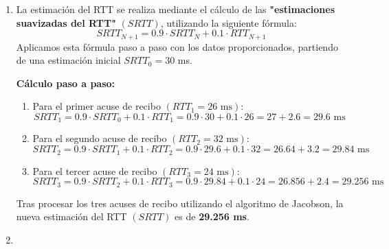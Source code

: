 \begin{enumerate}[label=\color{red}\textbf{\arabic*)}]
	      La fase de comienzo lento se caracteriza porque \textbf{"se comienza por doblar el valor de cwnd cada RTT unidades de tiempo"}. Aplicando esta secuencia temporalmente con nuestro RTT de 10 ms:
	      \begin{itemize}[label=\textbullet]
		      \item $t=0$ ms: El valor inicial es de \textbf{1 segmento} (2 KB)
		      \item $t=10$ ms: Se dobla el valor a \textbf{2 segmentos} (4 KB)
		      \item $t=20$ ms: Se dobla el valor a \textbf{4 segmentos} (8 KB)
		      \item $t=30$ ms: Se dobla el valor a \textbf{8 segmentos} (16 KB)
		      \item $t=40$ ms: Se dobla el valor a \textbf{16 segmentos} (32 KB)
	      \end{itemize}
	      A los \textbf{40 ms (4 RTTs)}, el valor de la ventana de congestión alcanza los 16 segmentos, superando por primera vez la capacidad total de la ventana de recepción (12 segmentos). por lo tanto, se tarda \textbf{40 ms} en alcanzar la capacidad necesaria para poder enviar la primera ventana completa de 24 KB.
	\item {}

	      La estimación del RTT se realiza mediante el cálculo de las \textbf{"estimaciones suavizadas del RTT"} $(SRTT)$, utilizando la siguiente fórmula: \[
		      SRTT_{N+1}=0.9\cdot SRTT_N+0.1\cdot RTT_{N+1}
	      \]
	      Aplicamos esta fórmula paso a paso con los datos proporcionados, partiendo de una estimación inicial $SRTT_0=30$ ms.

	      \textbf{Cálculo paso a paso:}
	      \begin{enumerate}[label=\arabic*)]
		      \item Para el primer acuse de recibo $(RTT_1=26\text{ ms})$: \[
			            SRTT_1=0.9\cdot SRTT_0 + 0.1\cdot RTT_1=0.9\cdot 30 + 0.1\cdot 26=27+2.6=29.6\text{ ms}
		            \]
		      \item Para el segundo acuse de recibo $(RTT_2=32\text{ ms})$: \[
			            SRTT_2=0.9\cdot SRTT_1+0.1\cdot RTT_2=0.9\cdot 29.6+0.1\cdot 32=26.64+3.2=29.84\text{ ms}
		            \]
		      \item Para el tercer acuse de recibo $(RTT_3=24\text{ ms})$: \[
			            SRTT_3=0.9\cdot SRTT_2+0.1\cdot RTT_3=0.9\cdot 29.84 + 0.1\cdot 24=26.856+2.4=29.256 \text{ ms}
		            \]
	      \end{enumerate}
	      Tras procesar los tres acuses de recibo utilizando el algoritmo de Jacobson, la nueva estimación del RTT $(SRTT)$ es de \textbf{29.256 ms}.
	\item {}


\end{enumerate}
